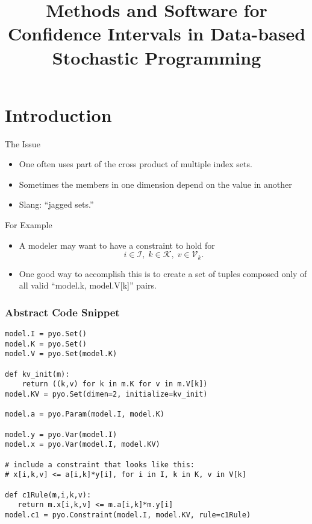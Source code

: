 \documentclass[9pt,usenames,dvipsnames]{beamer}
\title{Methods and Software for Confidence Intervals in Data-based Stochastic Programming}
\date{}
\author{}
\institute{\inst{1} Graduate School of Management, \\ University of California, Davis}
\date{}
\begin{document}
\maketitle

\section{Introduction}

\begin{frame}{The Issue}
\begin{itemize}
\item One often uses part of the cross product
  of multiple index sets.
\item Sometimes the
members in one dimension depend on the value in another
\item Slang: ``jagged sets.''
\end{itemize}
\end{frame}

\begin{frame}{For Example}
\begin{itemize}
\item   A modeler may want to have a constraint to hold for
$$
i \in \mathcal{I},\; k \in \mathcal{K}, \; v \in \mathcal{V}_{k}.
$$
\item  One good way to accomplish this is to create a
set of tuples composed only of all valid ``model.k, model.V[k]'' pairs.
\end{itemize}
\end{frame}

\begin{frame}[fragile=singleslide]\frametitle{Abstract Code Snippet}

\begin{verbatim}
model.I = pyo.Set()
model.K = pyo.Set()
model.V = pyo.Set(model.K)

def kv_init(m):
    return ((k,v) for k in m.K for v in m.V[k])
model.KV = pyo.Set(dimen=2, initialize=kv_init)

model.a = pyo.Param(model.I, model.K)

model.y = pyo.Var(model.I)
model.x = pyo.Var(model.I, model.KV)

# include a constraint that looks like this:
# x[i,k,v] <= a[i,k]*y[i], for i in I, k in K, v in V[k]

def c1Rule(m,i,k,v):
   return m.x[i,k,v] <= m.a[i,k]*m.y[i]
model.c1 = pyo.Constraint(model.I, model.KV, rule=c1Rule)
\end{verbatim}

\end{frame}
\end{document}
